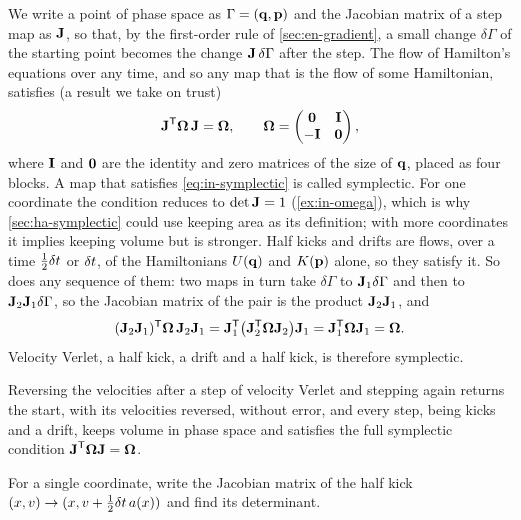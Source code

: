 We write a point of phase space as $\Gamma = (\bm{\mathrm{q}}, \bm{\mathrm{p}})$ and the
Jacobian matrix of a step map as $\bm{\mathrm{J}}$, so that, by the first-order
rule of \cref{sec:en-gradient}, a small change $\delta\Gamma$ of the
starting point becomes the change $\bm{\mathrm{J}}\,\delta\Gamma$ after the step.
The flow of Hamilton's equations over any time, and so any map that is
the flow of some Hamiltonian, satisfies (a result we take on trust)
\begin{equation}
   \bm{\mathrm{J}}^{\mathsf T}\boldsymbol{\Omega}\,\bm{\mathrm{J}} = \boldsymbol{\Omega} ,
   \qquad
   \boldsymbol{\Omega} = \begin{pmatrix} \bm{\mathrm{0}} & \bm{\mathrm{I}}\\ -\bm{\mathrm{I}} & \bm{\mathrm{0}}
   \end{pmatrix} ,
   \label{eq:in-symplectic}
\end{equation}
where $\bm{\mathrm{I}}$ and $\bm{\mathrm{0}}$ are the identity and zero matrices of the size
of $\bm{\mathrm{q}}$, placed as four blocks. A map that satisfies
\cref{eq:in-symplectic} is called symplectic\cite{LeimkuhlerMatthews2015}.
For one coordinate the condition reduces to $\det\bm{\mathrm{J}} = 1$
(\cref{ex:in-omega}), which is why \cref{sec:ha-symplectic} could use
keeping area as its definition; with more coordinates it implies keeping
volume but is stronger. Half kicks and drifts are flows, over a time
$\frac12\delta t$ or $\delta t$, of the Hamiltonians $U(\bm{\mathrm{q}})$ and $K(\bm{\mathrm{p}})$
alone, so they satisfy it. So
does any sequence of them: two maps in turn take $\delta\Gamma$ to
$\bm{\mathrm{J}}_1\delta\Gamma$ and then to $\bm{\mathrm{J}}_2\bm{\mathrm{J}}_1\delta\Gamma$, so the
Jacobian matrix of the pair is the product $\bm{\mathrm{J}}_2\bm{\mathrm{J}}_1$, and
\begin{equation*}
   (\bm{\mathrm{J}}_2\bm{\mathrm{J}}_1)^{\mathsf T}\boldsymbol{\Omega}\,\bm{\mathrm{J}}_2\bm{\mathrm{J}}_1
   = \bm{\mathrm{J}}_1^{\mathsf T}\bigl(\bm{\mathrm{J}}_2^{\mathsf T}\boldsymbol{\Omega}
   \bm{\mathrm{J}}_2\bigr)\bm{\mathrm{J}}_1 = \bm{\mathrm{J}}_1^{\mathsf T}\boldsymbol{\Omega}\bm{\mathrm{J}}_1
   = \boldsymbol{\Omega} .
\end{equation*}
Velocity Verlet, a half kick, a drift and a half kick, is therefore
symplectic.

\begin{keyidea}
Reversing the velocities after a step of velocity Verlet and stepping
again returns the start, with its velocities reversed, without error, and
every step, being kicks and a drift,
keeps volume in phase space and satisfies the full symplectic condition
$\bm{\mathrm{J}}^{\mathsf T}\boldsymbol{\Omega}\bm{\mathrm{J}} = \boldsymbol{\Omega}$.
\end{keyidea}

\begin{selfcheck}
For a single coordinate, write the Jacobian matrix of the half kick
$(x, v) \to (x, v + \frac12\delta t\,a(x))$ and find its determinant.
\end{selfcheck}

